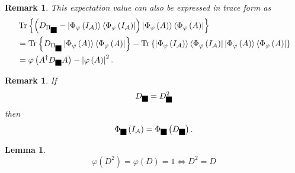 \documentclass[aps,preprint]{revtex4}%
\providecommand{\U}[1]{\protect\rule{.1in}{.1in}}
\newtheorem{lemma}[theorem]{Lemma}
\newtheorem{remark}[theorem]{Remark}
\begin{document}
\begin{remark}
This expectation value can also be expressed in trace form as
\begin{align}
&  \operatorname{Tr}\left\{  \left(  D_{\Pi_{\U{3c6} }}-\left\vert
\Phi_{\varphi}\left(  I_{\mathcal{A}}\right)  \right\rangle \left\langle
\Phi_{\varphi}\left(  I_{\mathcal{A}}\right)  \right\vert \right)  \left\vert
\Phi_{\varphi}\left(  A\right)  \right\rangle \left\langle \Phi_{\varphi
}\left(  A\right)  \right\vert \right\} \\
&  =\operatorname{Tr}\left\{  D_{\Pi_{\U{3c6} }}\left\vert \Phi_{\varphi
}\left(  A\right)  \right\rangle \left\langle \Phi_{\varphi}\left(  A\right)
\right\vert \right\}  -\operatorname{Tr}\left\{  \left\vert \Phi_{\varphi
}\left(  I_{\mathcal{A}}\right)  \right\rangle \left\langle \Phi_{\varphi
}\left(  I_{\mathcal{A}}\right)  \right\vert \left\vert \Phi_{\varphi}\left(
A\right)  \right\rangle \left\langle \Phi_{\varphi}\left(  A\right)
\right\vert \right\} \\
&  =\varphi\left(  A^{\dagger}D_{\U{3c6} }A\right)  -\left\vert \varphi\left(
A\right)  \right\vert ^{2}.
\end{align}

\end{remark}

\begin{remark}
If
\begin{equation}
D_{\U{3c6} }=D_{\U{3c6} }^{2}%
\end{equation}
then
\begin{equation}
\Phi_{\U{3c6} }\left(  I_{\mathcal{A}}\right)  =\Phi_{\U{3c6} }\left(
D_{\U{3c6} }\right)  .
\end{equation}

\end{remark}

\begin{lemma}%
\begin{equation}
\varphi\left(  D^{2}\right)  =\varphi\left(  D\right)  =1\Leftrightarrow
D^{2}=D
\end{equation}

\end{lemma}
\end{document}
